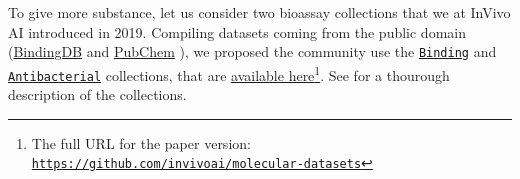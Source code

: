 \documentclass[11pt]{article}
\numberwithin{equation}{subsection}
\begin{document}
To give more substance, let us consider two bioassay collections that we at InVivo AI introduced in 2019. Compiling datasets coming from the public domain (\href{www.bindingdb.org}{BindingDB} and \href{https://pubchem.ncbi.nlm.nih.gov/}{PubChem} ), we proposed the community use the \hyperref[app:collections-binding]{\texttt{Binding}} and \hyperref[app:collections-antibacterial]{\texttt{Antibacterial}} collections, that are \href{https://github.com/invivoai/molecular-datasets}{available here}\footnote{The full URL for the paper version: \href{https://github.com/invivoai/molecular-datasets}{\texttt{https://github.com/invivoai/molecular-datasets}}}.
See  for a thourough description of the collections.
\end{document}
